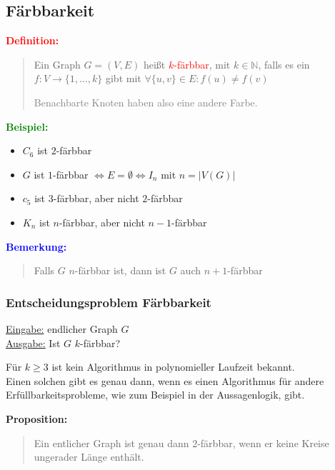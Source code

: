 \documentclass{article}
\newcommand{\red}[1]{\textcolor{red}{#1}}
\newcommand{\gray}[1]{\textcolor{gray}{#1}}
\newcommand{\blue}[1]{\textcolor{blue}{#1}}
\newcommand{\green}[1]{\textcolor{green}{#1}}
\newcommand{\dgr}[1]{\textcolor{dgr}{#1}}
\newcommand{\ex}{\green{\textbf{Beispiel: }}}
\newcommand{\de}[1]{\red{\textbf{Definition: }}\begin{quote}#1\end{quote}}
\newcommand{\an}[1]{\blue{\textbf{Bemerkung: }}\begin{quote}#1\end{quote}}
\newcommand{\prop}[1]{\dgr{\textbf{Proposition: }}\begin{quote}#1\end{quote}}
\newcommand{\N}{\mathbb{N}}
\begin{document}
\subsection{Färbbarkeit}

\de{
    Ein Graph $G=(V,E)$ heißt \red{$k$-färbbar}, mit $k \in \N$, falls es ein\\
    $f: V \to \{1, \dots, k\}$ gibt mit $\forall \{u,v\} \in E: f(u) \ne f(v)$

    \gray{Benachbarte Knoten haben also eine andere Farbe.}
}

\ex \begin{itemize}
    \item $C_6$ ist $2$-färbbar
    \item $G$ ist $1$-färbbar $\iff E = \emptyset \iff I_n$ mit $n = |V(G)|$
    \item $c_5$ ist $3$-färbbar, aber nicht $2$-färbbar
    \item $K_n$ ist $n$-färbbar, aber nicht $n-1$-färbbar
\end{itemize}

\an{
    Falls $G$ $n$-färbbar ist, dann ist $G$ auch $n+1$-färbbar
}

\subsubsection{Entscheidungsproblem Färbbarkeit}

\underline{Eingabe:} endlicher Graph $G$\\
\underline{Ausgabe:} Ist $G$ $k$-färbbar?

Für $k \ge 3$ ist kein Algorithmus in polynomieller Laufzeit bekannt.\\
Einen solchen gibt es genau dann, wenn es einen Algorithmus für andere\\
Erfüllbarkeitsprobleme, wie zum Beispiel in der Aussagenlogik, gibt.

\newpage
\prop{
    Ein entlicher Graph ist genau dann $2$-färbbar, wenn er keine Kreise ungerader Länge enthält.
}
\end{document}
